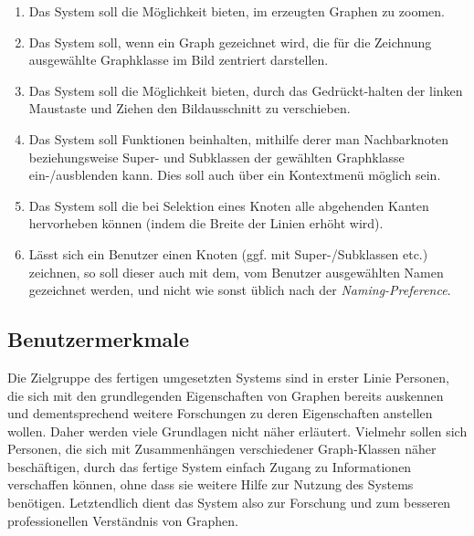 \documentclass[10pt,a4paper]{article}
\begin{document}
\begin{enumerate}[leftmargin=.9cm]
\item Das System soll die Möglichkeit bieten, im erzeugten Graphen zu zoomen.
\item Das System soll, wenn ein Graph gezeichnet wird, die für die Zeichnung ausgewählte Graphklasse im Bild zentriert darstellen.
\item Das System soll die Möglichkeit bieten, durch das Gedrückt-halten der linken Maustaste und Ziehen den Bildausschnitt zu verschieben.
\item Das System soll Funktionen beinhalten, mithilfe derer man Nachbarknoten beziehungsweise Super- und Subklassen der gewählten Graphklasse ein-/ausblenden kann. Dies soll auch über ein Kontextmenü möglich sein.
\item Das System soll die bei Selektion eines Knoten alle abgehenden Kanten hervorheben können (indem die Breite der Linien erhöht wird).
\item Lässt sich ein Benutzer einen Knoten (ggf. mit Super-/Subklassen etc.) zeichnen, so soll dieser auch mit dem, vom Benutzer ausgewählten Namen gezeichnet werden, und nicht wie sonst üblich nach der \textit{Naming-Preference}.
\end{enumerate}
     
    \subsection{Benutzermerkmale} %
	Die Zielgruppe des fertigen umgesetzten Systems sind in erster Linie Personen, die sich mit den grundlegenden Eigenschaften von Graphen bereits auskennen und dementsprechend weitere Forschungen zu deren Eigenschaften anstellen wollen. Daher werden viele Grundlagen nicht näher erläutert. Vielmehr sollen sich Personen, die sich mit Zusammenhängen verschiedener Graph-Klassen näher beschäftigen, durch das fertige System einfach Zugang zu Informationen verschaffen können, ohne dass sie weitere Hilfe zur Nutzung des Systems benötigen.
	Letztendlich dient das System also zur Forschung und zum besseren professionellen Verständnis von Graphen.
\end{document}
